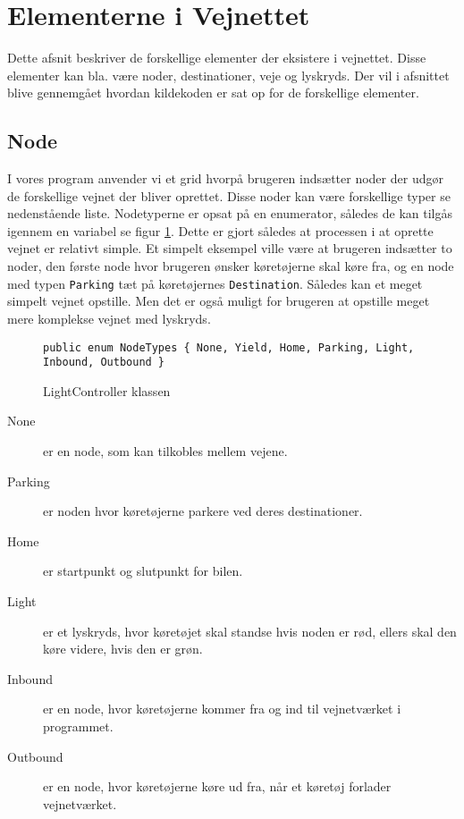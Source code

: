 \section{Elementerne i Vejnettet}\label{ElementerVejnettet}
Dette afsnit beskriver de forskellige elementer der eksistere i vejnettet. Disse elementer kan bla. være noder, destinationer, veje og lyskryds. Der vil i afsnittet blive gennemgået hvordan kildekoden er sat op for de forskellige elementer. 

\subsection{Node}
I vores program anvender vi et grid hvorpå brugeren indsætter noder der udgør de forskellige vejnet der bliver oprettet. Disse noder kan være forskellige typer se nedenstående liste. Nodetyperne er opsat på en enumerator, således de kan tilgås igennem en variabel se figur \ref{enumNodeTypes}. Dette er gjort således at processen i at oprette vejnet er relativt simple. Et simpelt eksempel ville være at brugeren indsætter to noder, den første node hvor brugeren ønsker køretøjerne skal køre fra, og en node med typen \texttt{Parking} tæt på køretøjernes \texttt{Destination}. Således kan et meget simpelt vejnet opstille. Men det er også muligt for brugeren at opstille meget mere komplekse vejnet med lyskryds.

\begin{figure}[H]
\begin{lstlisting}
public enum NodeTypes { None, Yield, Home, Parking, Light, Inbound, Outbound }
\end{lstlisting}
\caption{LightController klassen}\label{enumNodeTypes}
\end{figure}

\begin{description}
\item [None] er en node, som kan tilkobles mellem vejene.
\item [Parking] er noden hvor køretøjerne parkere ved deres destinationer.
\item [Home] er startpunkt og slutpunkt for bilen.
\item [Light] er et lyskryds, hvor køretøjet skal standse hvis noden er rød, ellers skal den køre videre, hvis den er grøn.
\item [Inbound] er en node, hvor køretøjerne kommer fra og ind til vejnetværket i programmet.
\item [Outbound] er en node, hvor køretøjerne køre ud fra, når et køretøj forlader vejnetværket.
\end{description}

